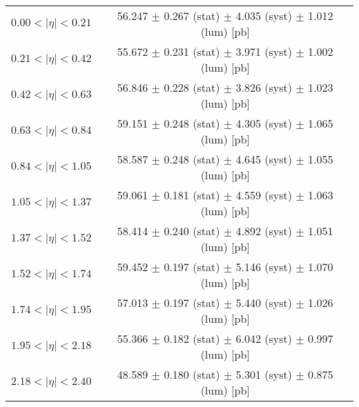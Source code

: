 \begin{tabular}{lc}
\hline
$0.00 < |\eta| <0.21$          & 56.247 $\pm$ 0.267 (stat) $\pm$ 4.035 (syst) $\pm$ 1.012 (lum) [pb]  \\
$0.21 < |\eta| <0.42$          & 55.672 $\pm$ 0.231 (stat) $\pm$ 3.971 (syst) $\pm$ 1.002 (lum) [pb]  \\
$0.42 < |\eta| <0.63$          & 56.846 $\pm$ 0.228 (stat) $\pm$ 3.826 (syst) $\pm$ 1.023 (lum) [pb]  \\
$0.63 < |\eta| <0.84$          & 59.151 $\pm$ 0.248 (stat) $\pm$ 4.305 (syst) $\pm$ 1.065 (lum) [pb]  \\
$0.84 < |\eta| <1.05$          & 58.587 $\pm$ 0.248 (stat) $\pm$ 4.645 (syst) $\pm$ 1.055 (lum) [pb]  \\
$1.05 < |\eta| <1.37$          & 59.061 $\pm$ 0.181 (stat) $\pm$ 4.559 (syst) $\pm$ 1.063 (lum) [pb]  \\
$1.37 < |\eta| <1.52$          & 58.414 $\pm$ 0.240 (stat) $\pm$ 4.892 (syst) $\pm$ 1.051 (lum) [pb]  \\
$1.52 < |\eta| <1.74$          & 59.452 $\pm$ 0.197 (stat) $\pm$ 5.146 (syst) $\pm$ 1.070 (lum) [pb]  \\
$1.74 < |\eta| <1.95$          & 57.013 $\pm$ 0.197 (stat) $\pm$ 5.440 (syst) $\pm$ 1.026 (lum) [pb]  \\
$1.95 < |\eta| <2.18$          & 55.366 $\pm$ 0.182 (stat) $\pm$ 6.042 (syst) $\pm$ 0.997 (lum) [pb]  \\
$2.18 < |\eta| <2.40$          & 48.589 $\pm$ 0.180 (stat) $\pm$ 5.301 (syst) $\pm$ 0.875 (lum) [pb]  \\
\hline
\end{tabular}
